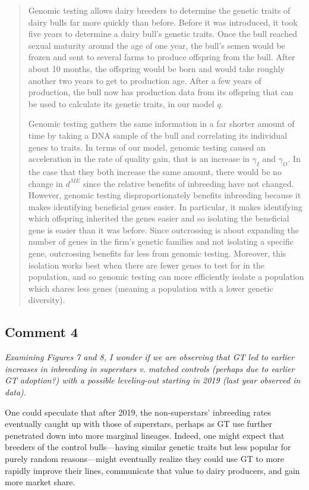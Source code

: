 \documentclass[12pt,letterpaper]{article}
\begin{document}
\begin{quote}
Genomic testing allows dairy breeders to determine the genetic traits of dairy bulls far more quickly than before.
Before it was introduced, it took five years to determine a dairy bull's genetic traits.
Once the bull reached sexual maturity around the age of one year, the bull's semen would be frozen and sent to several farms to produce offspring from the bull.
After about 10 months, the offspring would be born and would take roughly another two years to get to production age. 
After a few years of production, the bull now has production data from its offspring that can be used to calculate its genetic traits, in our model $q$.

Genomic testing gathers the same information in a far shorter amount of time by taking a DNA sample of the bull and correlating its individual genes to traits.
In terms of our model, genomic testing caused an acceleration in the rate of quality gain, that is an increase in $\gamma_I$ and $\gamma_O$.
In the case that they both increase the same amount, there would be no change in $d^{ME}$ since the relative benefits of inbreeding have not changed.
However, genomic testing disproportionately benefits inbreeding because it makes identifying beneficial genes easier.
In particular, it makes identifying which offspring inherited the genes easier and so isolating the beneficial gene is easier than it was before.
Since outcrossing is about expanding the number of genes in the firm's genetic families and not isolating a specific gene, outcrossing benefits far less from genomic testing.
Moreover, this isolation works best when there are fewer genes to test for in the population, and so genomic testing can more efficiently isolate a population which shares less genes (meaning a population with a lower genetic diversity).
\end{quote}


\subsection*{Comment 4}
{\it
Examining Figures 7 and 8, I wonder if we are observing that GT led to earlier
increases in inbreeding in superstars v. matched controls (perhaps due to earlier GT adoption?) with a possible leveling-out starting in 2019 (last year observed in data).

One could speculate that after 2019, the non-superstars’ inbreeding rates eventually caught up with those of superstars, perhaps as GT use further penetrated
down into more marginal lineages. Indeed, one might expect that breeders of the
control bulls—having similar genetic traits but less popular for purely random
reasons—might eventually realize they could use GT to more rapidly improve their
lines, communicate that value to dairy producers, and gain more market share.
}\\
\end{document}
